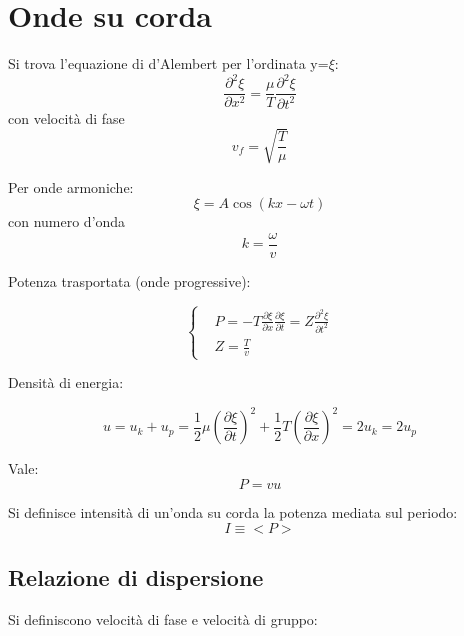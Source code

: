 \documentclass{article}
\begin{document}
\section{Onde su corda}

Si trova l'equazione di d'Alembert per l'ordinata y=$\xi$:
\begin{equation}
    \frac{\partial^2\xi}{\partial x^2}= \frac{\mu}{T}\frac{\partial^2 \xi}{\partial t^2}
\end{equation}
con velocità di fase
\begin{equation}
    v_f=\sqrt{\frac{T}{\mu}}
\end{equation}

Per onde armoniche:
\begin{equation}
    \xi=A\cos(kx-\omega t)
\end{equation}
con numero d'onda
\begin{equation}
    k=\frac{\omega}{v}
\end{equation}

Potenza trasportata (onde progressive):

\begin{equation}
\left\{
\begin{aligned}
   & P=-T\frac{\partial \xi}{\partial x}\frac{\partial \xi}{\partial t}= Z\frac{\partial^2 \xi}{\partial t^2} \\
   & Z=\frac{T}{v}
    \end{aligned}
    \right.
\end{equation}

Densità di energia:

\begin{equation}
    u=u_k+u_p= \frac{1}{2}\mu(\frac{\partial \xi}{\partial t})^2 + \frac{1}{2}T(\frac{\partial \xi}{\partial x})^2= 2u_k=2u_p
\end{equation}

Vale:
\begin{equation}
    P=vu
\end{equation}

Si definisce intensità di un'onda su corda la potenza mediata sul periodo:
\begin{equation}
    I\equiv <P>
\end{equation}



\subsection{Relazione di dispersione}
Si definiscono velocità di fase e velocità di gruppo:
\end{document}
